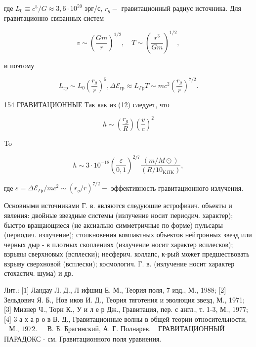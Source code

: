 \documentclass[10pt]{article}
\begin{document}
где $L_{0} \equiv c^{5} / G \approx 3,6 \cdot 10^{59}$ эрг/с, $r_{g}-$ гравитационный радиус источника. Для гравитационно связанных систем



\[

v \sim\left(\frac{G m}{r}\right)^{1 / 2}, \quad T \sim\left(\frac{r^{3}}{G m}\right)^{1 / 2},

\]



и поэтому



\[

L_{\mathrm{rp}} \sim L_{0}\left(\frac{r_{g}}{r}\right)^{5}, \Delta \mathscr{E}_{\mathrm{rp}} \approx L_{\Gamma \mathrm{p}} T \sim m c^{2}\left(\frac{r_{g}}{r}\right)^{7 / 2} .

\]



154 ГРАВИТАЦИОННЫЕ Так как из (12) следует, что



\[

h \sim\left(\frac{r_{g}}{R}\right)\left(\frac{v}{c}\right)^{2}

\]



To



\[

h \sim 3 \cdot 10^{-18}\left(\frac{\varepsilon}{0,1}\right)^{2 / 7} \frac{(m / M \odot)}{\left(R / 10_{\mathrm{K} \Pi \mathrm{K}}\right)},

\]



где $\varepsilon=\Delta \mathscr{E}_{\Gamma р} / m c^{2} \sim\left(r_{g} / r\right)^{7 / 2}-$ эффективность гравитационного излучения.



Основными источниками Г. в. являются следуюшие астрофизич. объекты и явления: двойные звездные системы (излучение носит периодич. характер); быстро вращающиеся (не аксиально симметричные по форме) пульсары (периодич. излучение); столкновения компактных объектов нейтронных звезд или черных дыр - в плотных скоплениях (излучение носит характер всплесков); взрывы сверхновых (всплески); несферич. коллапс, к-рый может предшествовать взрыву сверхновой (всплески); космологич. Г. в. (излучение носит характер стохастич. шума) и др.



Лит.: [1] Ландау Л. Д., Л ифшиц Е. М., Теория поля, 7 изд., М., 1988; [2] Зельдович Я. Б., Нов иков И. Д., Теория тяготения и эволюция звезд, М., 1971; [3] Мизнер Ч., Торн К., У и л е р Дж., Гравитация, пер. с англ., т. 1-3, М., 1977; [4] 3 а х а р о в В. Д., Гравитационные волны в общей теории относительности, $\begin{array}{ll}\text { М., 1972. } & \text { В. Б. Брагинский, А. Г. Полнарев. }\end{array}$ ГРАВИТАЦИОННЫЙ ПАРАДОКС - см. Гравитационного поля уравнения.
\end{document}
